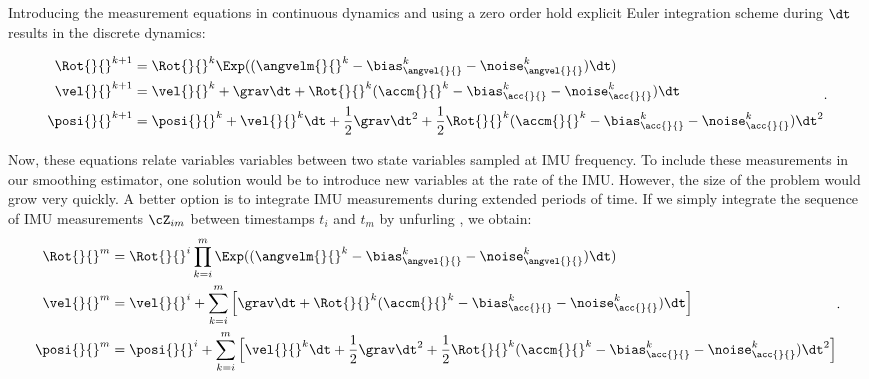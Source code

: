 Introducing the measurement equations  in continuous dynamics  and using a zero order hold
explicit Euler integration scheme during $\dt$ results in the discrete dynamics:

\begin{equation}
    \begin{split}
    \Rot{}{}^{k+1}  &= \Rot{}{}^{k}\Exp((\angvelm{}{}^k - \bias_{\angvel{}{}}^k - \noise_{\angvel{}{}}^k)\dt)
    \\
    \vel{}{}^{k+1}  &= \vel{}{}^{k} + \grav \dt + \Rot{}{}^{k}(\accm{}{}^k - \bias_{\acc{}{}}^k - \noise_{\acc{}{}}^k)\dt
    \\
    \posi{}{}^{k+1} &= \posi{}{}^{k} + \vel{}{}^{k}\dt + \frac{1}{2}\grav \dt^2 
    + \frac{1}{2}\Rot{}{}^{k}(\accm{}{}^k - \bias_{\acc{}{}}^k - \noise_{\acc{}{}}^k)\dt^2
    \end{split}.
    \label{eq:imu_dyn_disc}
\end{equation}
    
Now, these equations relate variables variables between two state variables sampled at IMU frequency. To include these measurements in our smoothing estimator,
one solution would be to introduce new variables at the rate of the IMU. However, the size of the problem would grow very quickly. A better option
is to integrate IMU measurements during extended periods of time. If we simply integrate the sequence of IMU measurements $\cZ_{im}$ between timestamps 
$t_i$ and $t_m$ by unfurling , we obtain:
%
\begin{equation}
    \begin{split}
    \Rot{}{}^{m}  &= \Rot{}{}^{i} \prod_{k=i}^{m} \Exp((\angvelm{}{}^k - \bias_{\angvel{}{}}^k - \noise_{\angvel{}{}}^k)\dt) \\
    \vel{}{}^{m}  &= \vel{}{}^{i} + \sum_{k=i}^{m} \Big[\grav \dt + \Rot{}{}^{k}(\accm{}{}^k - \bias_{\acc{}{}}^k - \noise_{\acc{}{}}^k)\dt \Big]  \\
    \posi{}{}^{m} &= \posi{}{}^{i} + \sum_{k=i}^{m} \Big[\vel{}{}^{k}\dt + \frac{1}{2}\grav \dt^2 
    + \frac{1}{2}\Rot{}{}^{k}(\accm{}{}^k - \bias_{\acc{}{}}^k - \noise_{\acc{}{}}^k)\dt^2 \Big]
    \end{split}.
    \label{eq:IMUIntij}
\end{equation}


